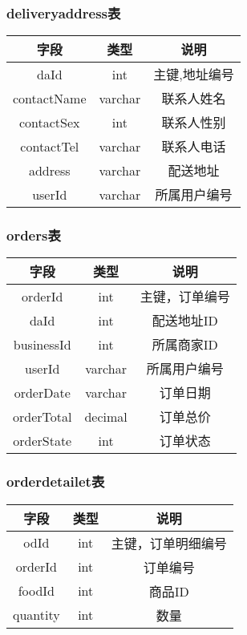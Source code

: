 \subsubsection{deliveryaddress表}
\begin{tabular}{c|c|c}
	\hline
	字段 & 类型 & 说明 \\
	\hline
	daId & int & 主键,地址编号 \\
	\hline
	contactName & varchar & 联系人姓名 \\
	\hline
	contactSex & int & 联系人性别 \\
	\hline
	contactTel & varchar & 联系人电话 \\
	\hline
	address & varchar & 配送地址 \\
	\hline
	userId & varchar & 所属用户编号 \\
\end{tabular}

\subsubsection{orders表}
\begin{tabular}{c|c|c}
	\hline
	字段 & 类型 & 说明 \\
	\hline
	orderId & int & 主键，订单编号 \\
	\hline
	daId & int & 配送地址ID \\
	\hline
	businessId & int & 所属商家ID \\
	\hline
	userId & varchar & 所属用户编号 \\
	\hline
	orderDate & varchar & 订单日期 \\
	\hline
	orderTotal & decimal & 订单总价 \\
	\hline
	orderState & int & 订单状态 \\
\end{tabular}


\subsubsection{orderdetailet表}
\begin{tabular}{c|c|c}
	\hline
	字段 & 类型 & 说明 \\
	\hline
	odId & int & 主键，订单明细编号 \\
	\hline
	orderId & int &订单编号 \\
	\hline
	foodId & int & 商品ID \\
	\hline
	quantity & int & 数量 \\
\end{tabular}


